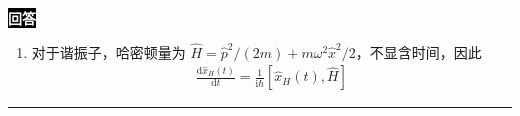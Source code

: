 \documentclass[11pt,a4paper]{ctexart}
\newenvironment{answer}
  {\par\smallskip\noindent
   \begingroup
   \setlength{\fboxsep}{4pt}%
   \colorbox{black}{\textcolor{white}{\bfseries 回答}}%
   \endgroup
   \quad\ignorespaces}
  {\par\smallskip\noindent\rule{\linewidth}{0.4pt}\medskip}
\begin{document}
\begin{answer}
\begin{enumerate}
\begin{equation}
\begin{aligned}
        =-\frac{\hbar^2 }{2m }\frac{\partial^2 }{\partial x_0^2 } K^*(x,t;x_0,t_0),
      \end{aligned}
    \end{equation}
    代入 \eqref{eq:time-evolution} 得到方程：
    \begin{equation}
      -\mathrm{i}\hbar\frac{\partial }{\partial t}K^*(x,t;x_0,t_0)
      =-\frac{\hbar^2 }{2m }\frac{\partial^2 }{\partial x_0^2 } K^*(x,t;x_0,t_0),
    \end{equation}
    也即：
    \begin{equation}
      -\mathrm{i} \hbar \frac{\partial C_1(x,t;t_0) }{\partial t }
      =\frac{\mathrm{i}\hbar }{2(t-t_0) } C_1(x,t;t_0),  
    \end{equation}
    解得：
    \begin{equation}
      C_1(x,t;t_0)
      =C_2(x,t_0) \frac{1 }{\sqrt{t-t_0} } ,
    \end{equation}
    \begin{equation}
        K^*(x,t;x_0,t_0)
        =\frac{C_2(x,t_0) }{\sqrt{t-t_0} } \exp\left[-\frac{\mathrm{i}m\left(x-x_0 \right)^2 }{2\hbar (t-t_0) }  \right].
    \end{equation}
    利用初始条件 $\displaystyle{\lim_{t\to t_0^+} K(x,t;x_0,t_0) = \delta(x-x_0) } $ 以及公式
    \begin{equation}
      \delta(x-x_0)
      =\lim_{\tau\to 0^+} \sqrt{\frac{m }{-2\pi\mathrm{i}\hbar\tau } }\exp\left[-\frac{\mathrm{i}m(x-x_0)^2 }{2\hbar\tau }  \right],
      \label{eq:delta}
    \end{equation}
    对比可得：
    \begin{equation}
      C_2(x,t_0)
      =\sqrt{\frac{m }{-2\pi\mathrm{i}\hbar } },\qquad
      K^*(x,t;x_0,t_0)
      =\sqrt{\frac{m }{-2\pi\mathrm{i}\hbar(t-t_0) } } \exp\left[-\frac{\mathrm{i}m\left(x-x_0 \right)^2 }{2\hbar (t-t_0) }  \right],
    \end{equation}
    \begin{equation}
      K(x,t;x_0,t_0)
      =\sqrt{\frac{m }{2\pi\mathrm{i}\hbar(t-t_0) } } \exp\left[\frac{\mathrm{i}m\left(x-x_0 \right)^2 }{2\hbar (t-t_0) }  \right].
    \end{equation}
    \item 对于谐振子，哈密顿量为 $\hat{H}=\hat{p}^2/(2m) + m\omega^2 \hat{x}^2/2 $，不显含时间，因此
    \begin{equation}
      \begin{aligned}
        \frac{\mathrm{d}\hat{x}_H(t) }{\mathrm{d}t }
        =\frac{1 }{\mathrm{i}\hbar }\left[\hat{x}_H(t),\hat{H} \right]  

\end{aligned}
\end{equation}
\end{enumerate}
\end{answer}
\end{document}
